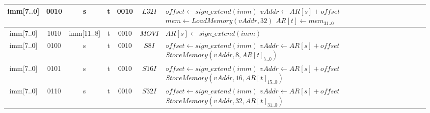 \begin{longtable}{llllllllllllllllllllllll  p{1cm}  p{7cm} | }
	   \multicolumn{8}{|c|}{imm[7..0]} & \multicolumn{4}{c|}{0010} & \multicolumn{4}{c|}{s} & \multicolumn{4}{c|}{t} & \multicolumn{4}{c|}{0010} & \multicolumn{1}{c|}{$L32I$} & $offset \leftarrow sign\_extend(imm)$ \newline $vAddr \leftarrow AR[s] + offset$ \newline $mem \leftarrow LoadMemory(vAddr, 32)$ \newline $AR[t] \leftarrow mem_{31..0}$\\ \hline
	   \multicolumn{8}{|c|}{imm[7..0]} & \multicolumn{4}{c|}{1010} & \multicolumn{4}{c|}{imm[11..8]} & \multicolumn{4}{c|}{t} & \multicolumn{4}{c|}{0010} & \multicolumn{1}{c|}{$MOVI$} & $AR[s] \leftarrow sign\_extend(imm)$ \\ \hline
       \multicolumn{8}{|c|}{imm[7..0]} & \multicolumn{4}{c|}{0100} & \multicolumn{4}{c|}{s} & \multicolumn{4}{c|}{t} & \multicolumn{4}{c|}{0010} & \multicolumn{1}{c|}{$S8I$} & $offset \leftarrow sign\_extend(imm)$ \newline $vAddr \leftarrow AR[s] + offset$ \newline $StoreMemory(vAddr, 8, AR[t]_{7..0})$\\ \hline
       \multicolumn{8}{|c|}{imm[7..0]} & \multicolumn{4}{c|}{0101} & \multicolumn{4}{c|}{s} & \multicolumn{4}{c|}{t} & \multicolumn{4}{c|}{0010} & \multicolumn{1}{c|}{$S16I$} & $offset \leftarrow sign\_extend(imm)$ \newline $vAddr \leftarrow AR[s] + offset$ \newline $StoreMemory(vAddr, 16, AR[t]_{15..0})$\\ \hline
       \multicolumn{8}{|c|}{imm[7..0]} & \multicolumn{4}{c|}{0110} & \multicolumn{4}{c|}{s} & \multicolumn{4}{c|}{t} & \multicolumn{4}{c|}{0010} & \multicolumn{1}{c|}{$S32I$} & $offset \leftarrow sign\_extend(imm)$ \newline $vAddr \leftarrow AR[s] + offset$ \newline $StoreMemory(vAddr, 32, AR[t]_{31..0})$\\ \hline
	\end{longtable}

